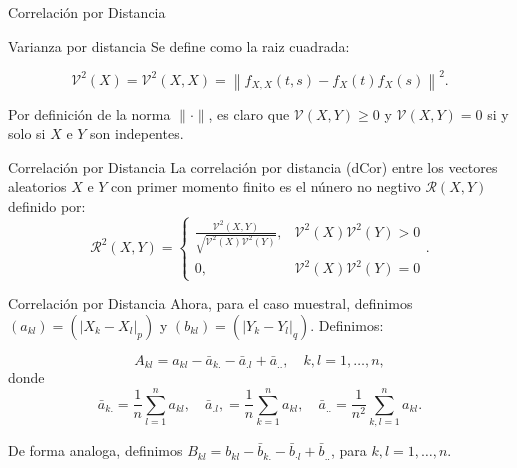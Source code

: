 \documentclass{beamer}
\begin{document}
\begin{frame}{Correlaci\'on por Distancia}
    \begin{block}{Varianza por distancia}
        Se define como la raiz cuadrada:

        $$
        \mathcal{V}^2(X)=\mathcal{V}^2(X, X)=\left\|f_{X, X}(t, s)-f_X(t) f_X(s)\right\|^2 .
        $$
    
        Por definici\'on de la norma $\|\cdot\|$, es claro que  $\mathcal{V}(X, Y) \geq 0$ y $\mathcal{V}(X, Y)=0$ si y solo si $X$ e $Y$ son indepentes.
        
    \end{block}
    \begin{block}{Correlaci\'on por Distancia}
        La correlaci\'on por distancia (dCor) entre los vectores aleatorios $X$ e $Y$ con primer momento finito es el n\'unero no negtivo $\mathcal{R}(X, Y)$ definido por:
		$$
		\mathcal{R}^2(X, Y)= \begin{cases}\frac{\mathcal{V}^2(X, Y)}{\sqrt{\mathcal{V}^2(X) \mathcal{V}^2(Y)}}, & \mathcal{V}^2(X) \mathcal{V}^2(Y)>0 \\ 0, & \mathcal{V}^2(X) \mathcal{V}^2(Y)=0\end{cases}.
		$$
    \end{block}
\end{frame}

\begin{frame}{Correlaci\'on por Distancia}
    Ahora, para el caso muestral, definimos $\left(a_{k l}\right)=\left(\left|X_k-X_l\right|_p\right)$ y $\left(b_{k l}\right)=\left(\left|Y_k-Y_l\right|_q\right)$. Definimos:

	$$
	A_{k l}=a_{k l}-\bar{a}_{k .}-\bar{a}_{. l}+\bar{a}_{. .}, \quad k, l=1, \ldots, n,
	$$
	donde
	$$
	\bar{a}_{k .}=\frac{1}{n} \sum_{l=1}^n a_{k l}, \quad \bar{a}_{. l},=\frac{1}{n} \sum_{k=1}^n a_{k l}, \quad \bar{a}_{. .}=\frac{1}{n^2} \sum_{k, l=1}^n a_{k l} .
	$$
	
	De forma analoga, definimos $B_{k l}=b_{k l}-\bar{b}_{k .}-\bar{b}_{\cdot l}+\bar{b}_{. .}$, para $k, l=1, \ldots, n$.
\end{frame}
\end{document}
